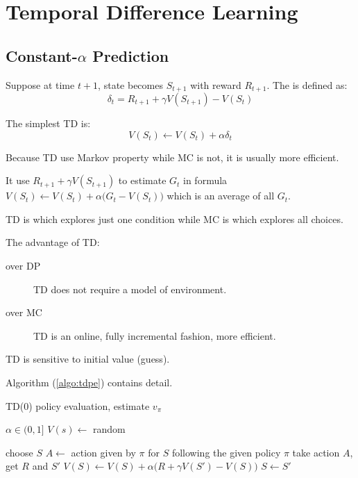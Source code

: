 

\section{Temporal Difference Learning}

\subsection{Constant-$\alpha$  Prediction}

Suppose at time $t+1$, state becomes $S_{t+1}$ with reward $R_{t+1}$. The   is defined as:
\begin{equation}
	\delta_t = R_{t+1} + \gamma V(S_{t+1}) - V(S_t)
\end{equation}

The simplest TD is:
\begin{equation}
	V(S_t) \gets V(S_t) + \alpha \delta_t
\end{equation}

Because TD use Markov property while MC is not, it is usually more efficient.

It use $R_{t+1} + \gamma V(S_{t+1})$ to estimate $G_t$ in formula $V(S_t) \gets V(S_t) + \alpha \Big ( G_t - V(S_t) \Big )$ which is an average of all $G_t$.

TD is  which explores just one condition while MC is  which explores all choices.

The advantage of TD:
\begin{description}
	\item [over DP] TD does not require a model of environment.
	\item [over MC] TD is an online, fully incremental fashion, more efficient.
\end{description}  

TD is sensitive to initial value (guess).


Algorithm (\ref{algo:tdpe}) contains detail.

\begin{algorithm}
	\caption{TD(0) policy evaluation, estimate $v_\pi$}\label{algo:tdpe}	
	
	\begin{algorithmic}[1]
		\State $ \alpha \in (0,1]$
		\State $V(s) \gets$ random 
		
		\Statex
		
		\Loop
			\State choose $S$
			\Repeat
				\State $A \gets$ action given by $\pi$ for $S$ \Comment following the given policy $\pi$
				\State take action $A$, get $R$ and $S'$
				\State $V(S) \gets V(S) + \alpha \Big (R + \gamma V(S') - V(S) \Big )$
				\State $S \gets S'$
		\EndLoop		
	\end{algorithmic}
\end{algorithm}

